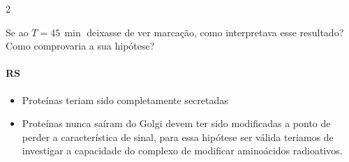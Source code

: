 \documentclass[\mainfilename]{subfiles}
\begin{document}
\begin{questionBox}2{}
    
    Se ao \(T=45\,\si{\min}\) deixasse de ver marcação, como interpretava esse resultado? Como comprovaria a sua hipótese?

    \paragraph*{RS}
    \begin{itemize}
        \item Proteínas teriam sido completamente secretadas
        \item Proteínas nunca saíram do Golgi devem ter sido modificadas a ponto de perder a característica de sinal, para essa hipótese ser válida teriamos de investigar a capacidade do complexo de modificar aminoácidos radioativos.
    \end{itemize}
    
\end{questionBox}
\end{document}
